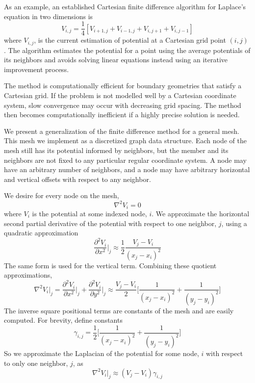 \documentclass{PoS}
\begin{document}
As an example, an established Cartesian finite difference algorithm for Laplace's equation in two dimensions is
\begin{equation}
    V_{i,j} = \frac{1}{4}[ 
    V_{i+1,j} +
    V_{i-1,j} +
    V_{i,j+1} +
    V_{i,j-1}]
\end{equation}
where $V_{i,j}$, is the current estimation of potential at a Cartesian grid point $(i,j)$ \cite{Landau2015}. The algorithm estimates the potential for a point using the average potentials of its neighbors and avoids solving linear equations instead using an iterative improvement process.

The method is computationally efficient for boundary geometries that satisfy a Cartesian grid. If the problem is not modelled well by a Cartesian coordinate system, slow convergence may occur with decreasing grid spacing. The method then becomes computationally inefficient if a highly precise solution is needed.

We present a generalization of the finite difference method for a general mesh. This mesh we implement as a discretized graph data structure. Each node of the mesh still has its potential informed by neighbors, but the member and its neighbors are not fixed to any particular regular coordinate system. A node may have an arbitrary number of neighbors, and a node may have arbitrary horizontal and vertical offsets with respect to any neighbor.

We desire for every node on the mesh,
\begin{equation}
    \nabla^2 V_i = 0
\end{equation}
where $V_i$ is the potential at some indexed node, $i$. We approximate the horizontal second partial derivative of the potential with respect to one neighbor, $j$, using a quadratic approximation
\begin{equation}
    \frac{\partial^2 V_i}{\partial x^2} \bigg\vert_j \approx
    \frac{1}{2}\frac{V_j - V_i}{(x_j-x_i)^2}
\end{equation}
The same form is used for the vertical term. Combining these quotient approximations,
\begin{equation}
    \nabla^2 V_i \vert_j = \frac{\partial^2 V_i}{\partial x^2} \bigg\vert_j + \frac{\partial^2 V_i}{\partial y^2} \bigg\vert_j \approx
    \frac{V_j - V_i}{2}\bigg[\frac{1}{(x_j - x_i)^2} + \frac{1}{(y_j - y_i)^2}\bigg]
\end{equation}
The inverse square positional terms are constants of the mesh and are easily computed. For brevity, define constants
\begin{equation}
    \gamma_{i,j} = \frac{1}{2}\bigg[\frac{1}{(x_j - x_i)^2} + \frac{1}{(y_j - y_i)^2}\bigg]
\end{equation}
So we approximate the Laplacian of the potential for some node, $i$ with respect to only one neighbor, $j$, as
\begin{equation}
    \nabla^2 V_i \vert_j \approx (V_j - V_i)\gamma_{i,j}
\end{equation}
\end{document}
